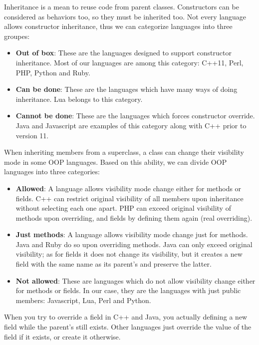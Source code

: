 \documentclass{KodeBook}
\begin{document}
\begin{discussion}

Inheritance is a mean to reuse code from parent classes.
Constructors can be considered as behaviors too, so they must be inherited too. 
Not every language allows constructor inheritance, thus we can categorize languages into three groupes:
\begin{itemize}
	\item \textbf{Out of box}: These are the languages designed to support constructor inheritance. 
	Most of our languages are among this category: C++11, Perl, PHP, Python and Ruby.
	\item \textbf{Can be done}: These are the languages which have many ways of doing inheritance. 
	Lua belongs to this category. 
	\item \textbf{Cannot be done}: These are the languages which forces constructor override. 
	Java and Javascript are examples of this category along with C++ prior to version 11.
\end{itemize}

When inheriting members from a superclass, a class can change their visibility mode in some OOP languages. 
Based on this ability, we can divide OOP languages into three categories:
\begin{itemize}
	\item \textbf{Allowed}: A language allows visibility mode change either for methods or fields. 
	C++ can restrict original visibility of all members upon inheritance without selecting each one apart. 
	PHP can exceed original visibility of methods upon overriding, and fields by defining them again (real overriding).
	\item \textbf{Just methods}: A language allows visibility mode change just for methods. 
	Java and Ruby do so upon overriding methods. 
	Java can only exceed original visibility; as for fields it does not change its visibility, but it creates a new field with the same name as its parent's and preserve the latter.
	\item \textbf{Not allowed}: These are languages which do not allow visibility change either for methods or fields. 
	In our case, they are the languages with just public members: Javascript, Lua, Perl and Python.
\end{itemize}

When you try to override a field in C++ and Java, you actually defining a new field while the parent's still exists. 
Other languages just override the value of the field if it exists, or create it otherwise. 


\end{discussion}
\end{document}
